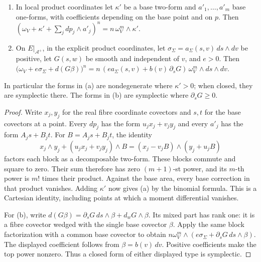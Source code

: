 \begin{lemma}\label{lem:hdl-top-power}
\begin{enumerate}[label=(\alph*)]
\item In local product coordinates let $\kappa'$ be a base two-form and $a'_1,\dots,a'_m$ base one-forms, with
coefficients depending on the base point and on $p$. Then
$(\omega_V+\kappa'+\sum_jdp_j\wedge a'_j)^n=n\,\omega_V^m\wedge\kappa'$.
\item On $E|_{\mathcal A^+}$, in the explicit product coordinates, let $\sigma_\Sigma=a_\Sigma(s,v)\,ds\wedge dv$ be positive, let $G(s,w)$ be smooth and
independent of $v$, and $e>0$. Then
$\big(\omega_V+e\sigma_\Sigma+d(G\beta)\big)^n=n\,(e a_\Sigma(s,v)+b(v)\,\partial_sG)\,\omega_V^m\wedge ds\wedge dv$.
\end{enumerate}
In particular the forms in (a) are nondegenerate where $\kappa'>0$; when closed, they are
symplectic there. The forms in (b) are symplectic where $\partial_sG\ge0$.
\end{lemma}

\begin{proof}
Write $x_j,y_j$ for the real fibre coordinate covectors and $s,t$ for the base
covectors at a point. Every $dp_j$ has the form $u_jx_j+v_jy_j$ and every $a'_j$
has the form $A_js+B_jt$. For $B=A_js+B_jt$, the identity
\[
 x_j\wedge y_j+(u_jx_j+v_jy_j)\wedge B
 =(x_j-v_jB)\wedge(y_j+u_jB)
\]
factors each block as a decomposable two-form. These blocks commute and square
to zero. Their sum therefore has zero $(m+1)$-st power, and its $m$-th power is
$m!$ times their product. Against the base area, every base correction in that
product vanishes. Adding $\kappa'$ now gives (a) by the binomial formula. This is a
Cartesian identity, including points at which a moment differential vanishes.

For (b), write $d(G\beta)=\partial_sG\,ds\wedge\beta+d_wG\wedge\beta$.
Its mixed part has rank one: it is a fibre covector wedged with the single base
covector $\beta$. Apply the same block factorization with a common base covector
to obtain $n\omega_V^m\wedge(e\sigma_\Sigma+\partial_sG\,ds\wedge\beta)$.
The displayed coefficient follows from $\beta=b(v)\,dv$. Positive coefficients
make the top power nonzero. Thus a closed form of either displayed type is symplectic.
\end{proof}

